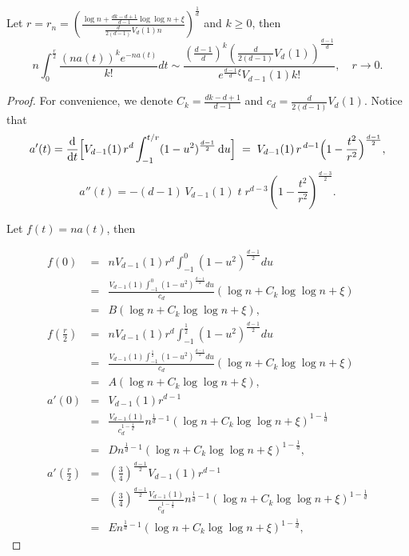 \documentclass[10pt,a4paper]{amsart}
\begin{document}
 \begin{lemma}\label{lemma:a(t)}
 Let $r=r_n=\left( \frac{\log n+ \frac{dk-d+1}{d-1} \log\log n+\xi}{ \frac{d}{2(d-1)}V_d(1) n }\right)^{\frac1d}$ and $k\geq 0$, then
$$
    n\int_0^{\frac r2}\frac{(na(t))^ke^{-na(t)}}{k!}dt\sim
   \frac{\left(\frac{d-1}{d}\right)^k\left(\frac{d}{2(d-1)}V_d(1)\right)^{\frac{d-1}{d}}}{e^{\frac{d-1}{d}\xi}{V_{d-1}(1)}k!}, \quad r\rightarrow 0.
$$
\end{lemma}

\begin{proof}
	For convenience, we denote $C_k=\frac{dk-d+1}{d-1}$ and $c_d = \frac{d}{2(d-1)}V_d(1)$. Notice that
	$$
	a'(t)
	=\frac{\mathrm{d}}{\mathrm{d}t}\Bigl[V_{d-1}(1)\,r^d
	\int_{-1}^{t/r}(1-u^2)^{\frac{d-1}2}\,\mathrm{d}u\Bigr]
	\;=\;V_{d-1}(1)\,r^{\,d-1}\Bigl(1-\frac{t^2}{r^2}\Bigr)^{\frac{d-1}2},
	$$
	$$
	a''(t)
	= - (d-1)\,V_{d-1}(1)\; t\; r^{d-3}\left(1 - \frac{t^2}{r^2}\right)^{\frac{d-3}{2}}.
	$$
	
	Let $f(t) = na(t)$, then
	
	\begin{eqnarray*}
		f(0) &=& nV_{d-1}(1)  r^d \int_{-1}^{0} (1 - u^2)^{\frac{d-1}{2}} du \\
		&=& \frac{V_{d-1}(1)\int_{-1}^{0} (1 - u^2)^{\frac{d-1}{2}}du}{c_d} \left( \log n+ C_k \log\log n+\xi\right)\\
		&=& B\left( \log n+ C_k \log\log n+\xi\right), \\
		f\left(\frac r2\right)
		&=&nV_{d-1}(1)  r^d \int_{-1}^{\frac{1}{2}} (1 - u^2)^{\frac{d-1}{2}} du\\
		&=&\frac{V_{d-1}(1)\int_{-1}^{\frac{1}{2}} (1 - u^2)^{\frac{d-1}{2}}du}{c_d} \left( \log n+ C_k \log\log n+\xi\right) \\
		&=& A\left( \log n+ C_k \log\log n+\xi\right), 	\\
		a'(0)
		&=&  V_{d-1}(1)  r^{d-1} \\
		&=& \frac{V_{d-1}(1)}{c_d^{1-\frac{1}{d}}}n^{\frac{1}{d}-1}\left(\log n+ C_k \log\log n+\xi\right)^{1-\frac{1}{d}} \\
		&=& Dn^{\frac{1}{d}-1}\left(\log n+ C_k \log\log n+\xi\right)^{1-\frac{1}{d}},\\
		a'(\frac{r}{2}) &
		=& \left(\frac{3}{4}\right)^{\frac{d-1}{2}}V_{d-1}(1)  r^{d-1} \\
		&=& \left(\frac{3}{4}\right)^{\frac{d-1}{2}}\frac{V_{d-1}(1)}{c_d^{1-\frac{1}{d}}}n^{\frac{1}{d}-1}\left(\log n+ C_k \log\log n+\xi\right)^{1-\frac{1}{d}} \\
		&=& E n^{\frac{1}{d}-1}\left(\log n+ C_k \log\log n+\xi\right)^{1-\frac{1}{d}},
	\end{eqnarray*}
	



\end{proof}
\end{document}
